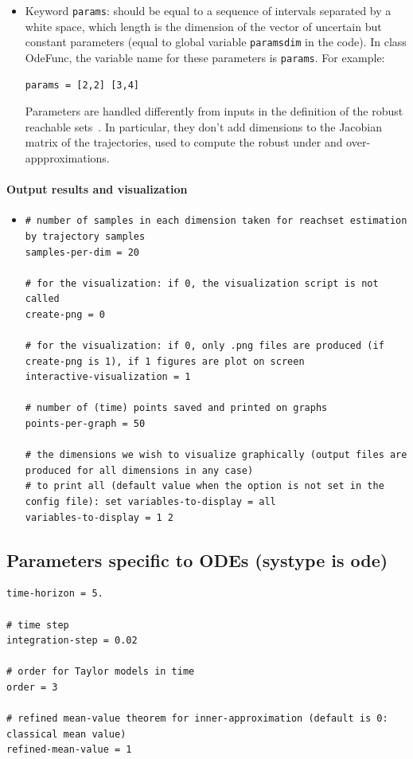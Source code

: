 \documentclass{article}
\begin{document}
\begin{itemize}
\item Keyword \texttt{params}: should be equal to  a sequence of  intervals separated by a white space,  which length is the dimension of the vector of uncertain but constant parameters (equal to global variable  \texttt{paramsdim} in the code).  In class OdeFunc, the variable name for these parameters is \texttt{params}.
For example:
\begin{verbatim}
params = [2,2] [3,4]
\end{verbatim}
Parameters are handled differently from inputs in the definition of the robust reachable sets~\cite{hscc19}.  In particular,  they don't add dimensions to the Jacobian matrix of the trajectories, used to compute the robust under and over-appproximations. 
\end{itemize}

\paragraph{Output results and visualization}
\begin{itemize}
\item
\begin{verbatim}
# number of samples in each dimension taken for reachset estimation by trajectory samples
samples-per-dim = 20

# for the visualization: if 0, the visualization script is not called
create-png = 0

# for the visualization: if 0, only .png files are produced (if create-png is 1), if 1 figures are plot on screen 
interactive-visualization = 1

# number of (time) points saved and printed on graphs 
points-per-graph = 50

# the dimensions we wish to visualize graphically (output files are produced for all dimensions in any case)
# to print all (default value when the option is not set in the config file): set variables-to-display = all
variables-to-display = 1 2
\end{verbatim}
\end{itemize}

\subsection{Parameters specific to ODEs (systype is ode)}

\begin{verbatim}
time-horizon = 5.

# time step
integration-step = 0.02

# order for Taylor models in time
order = 3

# refined mean-value theorem for inner-approximation (default is 0: classical mean value)
refined-mean-value = 1
\end{verbatim}
\end{document}
